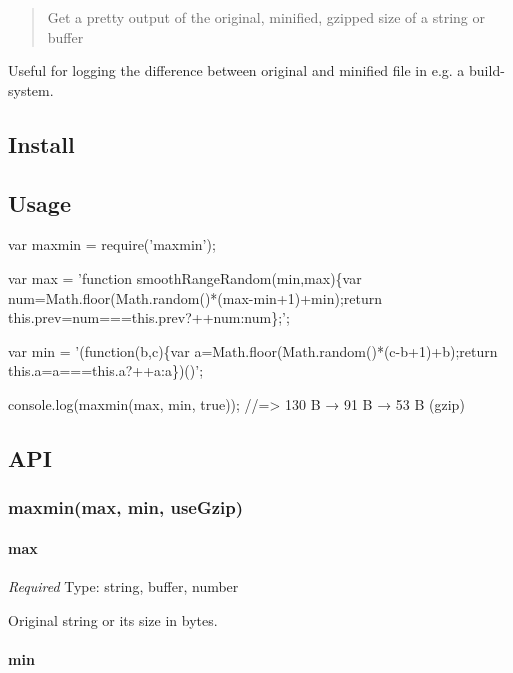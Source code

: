 \begin{quote}
Get a pretty output of the original, minified, gzipped size of a string or buffer \end{quote}




Useful for logging the difference between original and minified file in e.\+g. a build-\/system.

\subsection*{Install}




\subsection*{Usage}


\begin{DoxyCode}
var maxmin = require('maxmin');

var max = 'function smoothRangeRandom(min,max)\{var num=Math.floor(Math.random()*(max-min+1)+min);return
       this.prev=num===this.prev?++num:num\};';

var min = '(function(b,c)\{var a=Math.floor(Math.random()*(c-b+1)+b);return this.a=a===this.a?++a:a\})()';

console.log(maxmin(max, min, true));
//=> 130 B → 91 B → 53 B (gzip)
\end{DoxyCode}


\subsection*{A\+PI}

\subsubsection*{maxmin(max, min, use\+Gzip)}

\paragraph*{max}

{\itshape Required} Type\+: {\ttfamily string}, {\ttfamily buffer}, {\ttfamily number}

Original string or its size in bytes.

\paragraph*{min}

